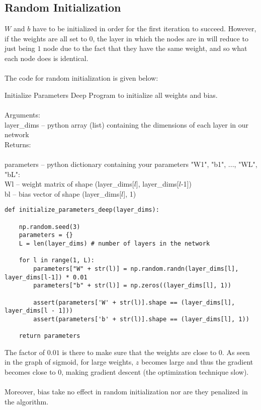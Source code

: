 \documentclass[a4paper]{article}
\begin{document}
\subsection{Random Initialization}
$W$ and $b$ have to be initialized in order for the first iteration to succeed. However, if the weights are all set to $0$, the layer in which the nodes are in will reduce to just being $1$ node due to the fact that they have the same weight, and so what each node does is identical. \\~\\
The code for random initialization is given below: 
\begin{alg}{Initialize Parameters Deep}{} Program to initialize all weights and bias. \\~\\
Arguments:\\
layer\_dims -- python array (list) containing the dimensions of each layer in our network\\
Returns: \\~\\
parameters -- python dictionary containing your parameters "W1", "b1", ..., "WL", "bL": \\
Wl -- weight matrix of shape (layer\_dims[$l$], layer\_dims[$l$-1])\\
bl -- bias vector of shape (layer\_dims[$l$], 1)\\
\begin{verbatim}
def initialize_parameters_deep(layer_dims):
    
    np.random.seed(3)
    parameters = {}
    L = len(layer_dims) # number of layers in the network

    for l in range(1, L):
        parameters["W" + str(l)] = np.random.randn(layer_dims[l], layer_dims[l-1]) * 0.01
        parameters["b" + str(l)] = np.zeros((layer_dims[l], 1))
        
        assert(parameters['W' + str(l)].shape == (layer_dims[l], layer_dims[l - 1]))
        assert(parameters['b' + str(l)].shape == (layer_dims[l], 1))
        
    return parameters
\end{verbatim}
\end{alg}

The factor of $0.01$ is there to make sure that the weights are close to $0$. As seen in the graph of sigmoid, for large weights, $z$ becomes large and thus the gradient becomes close to $0$, making gradient descent (the optimization technique slow). \\~\\
Moreover, bias take no effect in random initialization nor are they penalized in the algorithm. 
\end{document}
